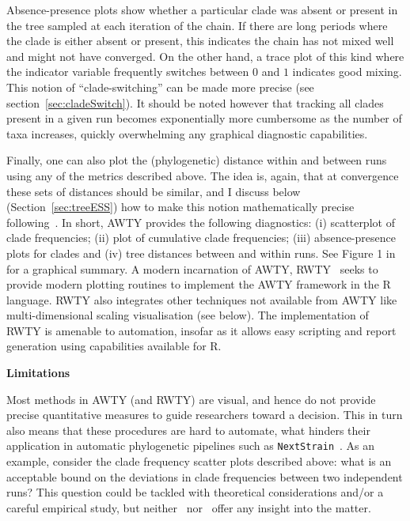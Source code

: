 Absence-presence plots show whether a particular clade was absent or present in the tree sampled at each iteration of the chain.
If there are long periods where the clade is either absent or present, this indicates the chain has not mixed well and might not have converged.
On the other hand, a trace plot of this kind where the indicator variable frequently switches between $0$ and $1$ indicates good mixing.
This notion of ``clade-switching'' can be made more precise (see section~\ref{sec:cladeSwitch}).
It should be noted however that tracking all clades present in a given run becomes exponentially more cumbersome as the number of taxa increases, quickly overwhelming any graphical diagnostic capabilities.

Finally, one can also plot the (phylogenetic) distance within and between runs using any of the metrics described above.
The idea is, again, that at convergence these sets of distances should be similar, and I discuss below (Section~\ref{sec:treeESS}) how to make this notion mathematically precise following~\cite{Whidden2015}.
In short, AWTY provides the following diagnostics: (i) scatterplot of clade frequencies; (ii) plot of cumulative  clade frequencies; (iii) absence-presence plots for clades and (iv) tree distances between and within runs.
See Figure 1 in~\cite{Nylander2008} for a graphical summary.
A modern incarnation of AWTY, RWTY~\citep{Warren2017} seeks to provide modern plotting routines to implement the AWTY framework in the R language.
RWTY also integrates other techniques not available from AWTY like multi-dimensional scaling visualisation (see below).
The implementation of RWTY is amenable to automation, insofar as it allows easy scripting and report generation using capabilities available for R.

\textbf{Limitations}

Most methods in AWTY (and RWTY) are visual, and hence do not provide precise quantitative measures to guide researchers toward a decision.
This in turn also means that these procedures are hard to automate, what hinders their application in automatic phylogenetic pipelines such as \verb|NextStrain|~\citep{Hadfield2017}.
As an example, consider the clade frequency scatter plots described above: what is an acceptable bound on the deviations in clade frequencies between two independent runs?
This question could be tackled with theoretical considerations and/or a careful empirical study, but neither~\cite{Nylander2008} nor~\cite{Warren2017} offer any insight into the matter.

